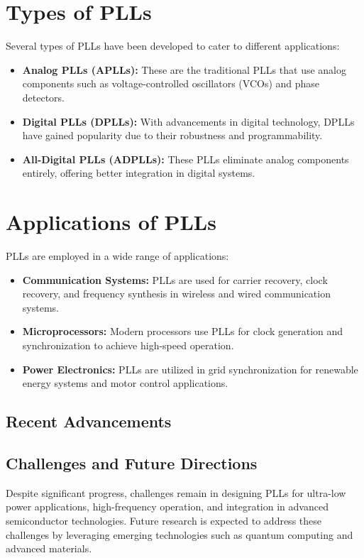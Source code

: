 \section{Types of PLLs}
Several types of PLLs have been developed to cater to different applications:
\begin{itemize}
    \item \textbf{Analog PLLs (APLLs):} These are the traditional PLLs that use analog components such as voltage-controlled oscillators (VCOs) and phase detectors.
    \item \textbf{Digital PLLs (DPLLs):} With advancements in digital technology, DPLLs have gained popularity due to their robustness and programmability.
    \item \textbf{All-Digital PLLs (ADPLLs):} These PLLs eliminate analog components entirely, offering better integration in digital systems.
\end{itemize}

\section{Applications of PLLs}
PLLs are employed in a wide range of applications:
\begin{itemize}
    \item \textbf{Communication Systems:} PLLs are used for carrier recovery, clock recovery, and frequency synthesis in wireless and wired communication systems.
    \item \textbf{Microprocessors:} Modern processors use PLLs for clock generation and synchronization to achieve high-speed operation.
    \item \textbf{Power Electronics:} PLLs are utilized in grid synchronization for renewable energy systems and motor control applications.
\end{itemize}

\subsection{Recent Advancements}

\subsection{Challenges and Future Directions}
Despite significant progress, challenges remain in designing PLLs for ultra-low power applications, high-frequency operation, and integration in advanced semiconductor technologies. Future research is expected to address these challenges by leveraging emerging technologies such as quantum computing and advanced materials.

% 
% 
